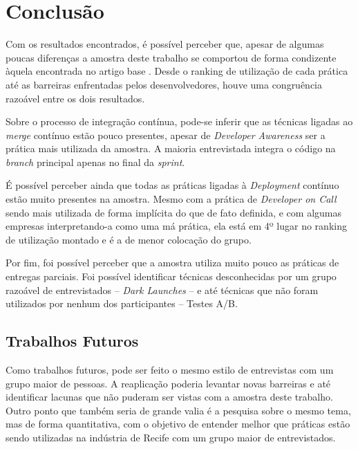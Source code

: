 
\chapter{Conclusão}

Com os resultados encontrados, é possível perceber que, apesar de algumas poucas diferenças a amostra deste trabalho se comportou de forma condizente àquela encontrada no artigo base \cite{empiricalStudy2016}. Desde o ranking de utilização de cada prática até as barreiras enfrentadas pelos desenvolvedores, houve uma congruência razoável entre os dois resultados. 

Sobre o processo de integração contínua, pode-se inferir que as técnicas ligadas ao \emph{merge} contínuo estão pouco presentes, apesar de \emph{Developer Awareness} ser a prática mais utilizada da amostra. A maioria entrevistada integra o código na \emph{branch} principal apenas no final da \emph{sprint}.

É possível perceber ainda que todas as práticas ligadas à \emph{Deployment} contínuo estão muito presentes na amostra. Mesmo com a prática de \emph{Developer on Call} sendo mais utilizada de forma implícita do que de fato definida, e com algumas empresas interpretando-a como uma má prática, ela está em 4º lugar no ranking de utilização montado e é a de menor colocação do grupo.

Por fim, foi possível perceber que a amostra utiliza muito pouco as práticas de entregas parciais. Foi possível identificar técnicas desconhecidas por um grupo razoável de entrevistados -- \emph{Dark Launches} -- e até técnicas que não foram utilizados por nenhum dos participantes -- Testes A/B.


\section{Trabalhos Futuros}

Como trabalhos futuros, pode ser feito o mesmo estilo de entrevistas com um grupo maior de pessoas. A reaplicação poderia levantar novas barreiras e até identificar lacunas que não puderam ser vistas com a amostra deste trabalho. Outro ponto que também seria de grande valia é a pesquisa sobre o mesmo tema, mas de forma quantitativa, com o objetivo de entender melhor que práticas estão sendo utilizadas na indústria de Recife com um grupo maior de entrevistados. 
